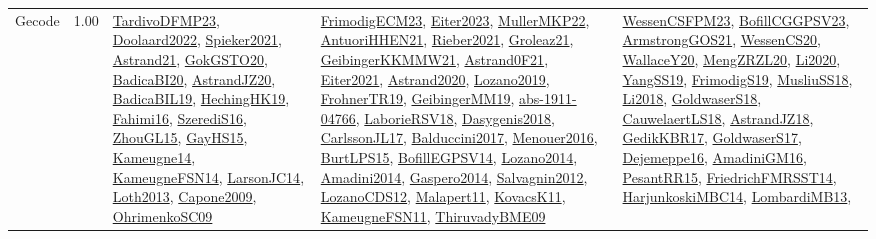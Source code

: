 {\begin{longtable}{p{3cm}r>{\raggedright\arraybackslash}p{6cm}>{\raggedright\arraybackslash}p{6cm}>{\raggedright\arraybackslash}p{8cm}}
\index{Gecode}\index{CPSystems!Gecode}Gecode &  1.00 & \hyperref[detail:TardivoDFMP23]{TardivoDFMP23}, \hyperref[detail:Doolaard2022]{Doolaard2022}, \hyperref[detail:Spieker2021]{Spieker2021}, \hyperref[detail:Astrand21]{Astrand21}, \hyperref[detail:GokGSTO20]{GokGSTO20}, \hyperref[detail:BadicaBI20]{BadicaBI20}, \hyperref[detail:AstrandJZ20]{AstrandJZ20}, \hyperref[detail:BadicaBIL19]{BadicaBIL19}, \hyperref[detail:HechingHK19]{HechingHK19}, \hyperref[detail:Fahimi16]{Fahimi16}, \hyperref[detail:SzerediS16]{SzerediS16}, \hyperref[detail:ZhouGL15]{ZhouGL15}, \hyperref[detail:GayHS15]{GayHS15}, \hyperref[detail:Kameugne14]{Kameugne14}, \hyperref[detail:KameugneFSN14]{KameugneFSN14}, \hyperref[detail:LarsonJC14]{LarsonJC14}, \hyperref[detail:Loth2013]{Loth2013}, \hyperref[detail:Capone2009]{Capone2009}, \hyperref[detail:OhrimenkoSC09]{OhrimenkoSC09} & \hyperref[detail:FrimodigECM23]{FrimodigECM23}, \hyperref[detail:Eiter2023]{Eiter2023}, \hyperref[detail:MullerMKP22]{MullerMKP22}, \hyperref[detail:AntuoriHHEN21]{AntuoriHHEN21}, \hyperref[detail:Rieber2021]{Rieber2021}, \hyperref[detail:Groleaz21]{Groleaz21}, \hyperref[detail:GeibingerKKMMW21]{GeibingerKKMMW21}, \hyperref[detail:Astrand0F21]{Astrand0F21}, \hyperref[detail:Eiter2021]{Eiter2021}, \hyperref[detail:Astrand2020]{Astrand2020}, \hyperref[detail:Lozano2019]{Lozano2019}, \hyperref[detail:FrohnerTR19]{FrohnerTR19}, \hyperref[detail:GeibingerMM19]{GeibingerMM19}, \hyperref[detail:abs-1911-04766]{abs-1911-04766}, \hyperref[detail:LaborieRSV18]{LaborieRSV18}, \hyperref[detail:Dasygenis2018]{Dasygenis2018}, \hyperref[detail:CarlssonJL17]{CarlssonJL17}, \hyperref[detail:Balduccini2017]{Balduccini2017}, \hyperref[detail:Menouer2016]{Menouer2016}, \hyperref[detail:BurtLPS15]{BurtLPS15}, \hyperref[detail:BofillEGPSV14]{BofillEGPSV14}, \hyperref[detail:Lozano2014]{Lozano2014}, \hyperref[detail:Amadini2014]{Amadini2014}, \hyperref[detail:Gaspero2014]{Gaspero2014}, \hyperref[detail:Salvagnin2012]{Salvagnin2012}, \hyperref[detail:LozanoCDS12]{LozanoCDS12}, \hyperref[detail:Malapert11]{Malapert11}, \hyperref[detail:KovacsK11]{KovacsK11}, \hyperref[detail:KameugneFSN11]{KameugneFSN11}, \hyperref[detail:ThiruvadyBME09]{ThiruvadyBME09} & \hyperref[detail:WessenCSFPM23]{WessenCSFPM23}, \hyperref[detail:BofillCGGPSV23]{BofillCGGPSV23}, \hyperref[detail:ArmstrongGOS21]{ArmstrongGOS21}, \hyperref[detail:WessenCS20]{WessenCS20}, \hyperref[detail:WallaceY20]{WallaceY20}, \hyperref[detail:MengZRZL20]{MengZRZL20}, \hyperref[detail:Li2020]{Li2020}, \hyperref[detail:YangSS19]{YangSS19}, \hyperref[detail:FrimodigS19]{FrimodigS19}, \hyperref[detail:MusliuSS18]{MusliuSS18}, \hyperref[detail:Li2018]{Li2018}, \hyperref[detail:GoldwaserS18]{GoldwaserS18}, \hyperref[detail:CauwelaertLS18]{CauwelaertLS18}, \hyperref[detail:AstrandJZ18]{AstrandJZ18}, \hyperref[detail:GedikKBR17]{GedikKBR17}, \hyperref[detail:GoldwaserS17]{GoldwaserS17}, \hyperref[detail:Dejemeppe16]{Dejemeppe16}, \hyperref[detail:AmadiniGM16]{AmadiniGM16}, \hyperref[detail:PesantRR15]{PesantRR15}, \hyperref[detail:FriedrichFMRSST14]{FriedrichFMRSST14}, \hyperref[detail:HarjunkoskiMBC14]{HarjunkoskiMBC14}, \hyperref[detail:LombardiMB13]{LombardiMB13}, 
\end{longtable}}
